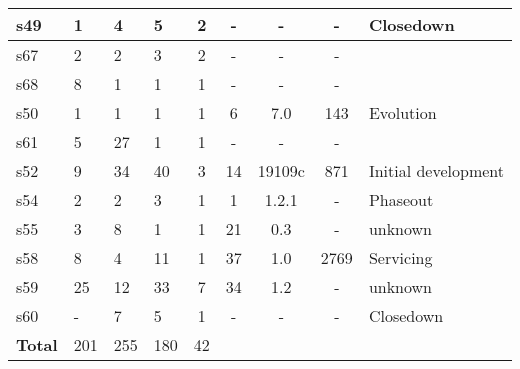 \begin{longtable}{| l | l | l | l | c | c | c | c | l |}
    \hline
s49 & 1 & 4 & 5 & 2 & - & - & - & Closedown \\
    \hline
s67 & 2 & 2 & 3 & 2 & - & - & - &  \\
    \hline
s68 & 8 & 1 & 1 & 1 & - & - & - &  \\
    \hline
s50 & 1 & 1 & 1 & 1 & 6 & 7.0 & 143 & Evolution \\
    \hline
s61 & 5 & 27 & 1 & 1 & - & - & - &  \\
    \hline
s52 & 9 & 34 & 40 & 3 & 14 & 19109c & 871 & Initial development \\
    \hline
s54 & 2 & 2 & 3 & 1 & 1 & 1.2.1 & - & Phaseout \\
    \hline
s55 & 3 & 8 & 1 & 1 & 21 & 0.3 & - & unknown \\
    \hline
s58 & 8 & 4 & 11 & 1 & 37 & 1.0 & 2769 & Servicing \\
    \hline
s59 & 25 & 12 & 33 & 7 & 34 & 1.2 & - & unknown \\
    \hline
s60 & - & 7 & 5 & 1 & - & - & - & Closedown \\
    \hline
  \hline
{\bf Total} & 201 & 255 & 180 & 42 &  &  &  &  \\
  \hline
\end{longtable}
